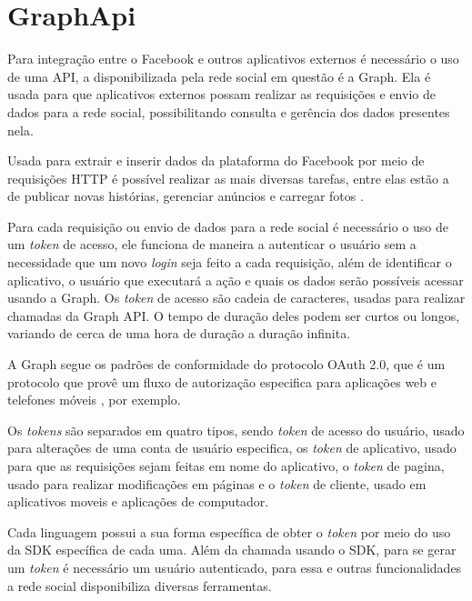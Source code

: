 \chapter[GraphApi]{GraphApi}

Para integração entre o Facebook e outros aplicativos externos é necessário o uso de uma API, a disponibilizada pela rede social em questão é a Graph. Ela é usada para que aplicativos externos possam realizar as requisições e envio de dados para a rede social, possibilitando consulta e gerência dos dados presentes nela. 


Usada para extrair e inserir dados da plataforma do Facebook por meio de requisições HTTP é possível realizar as mais diversas tarefas, entre elas estão a de publicar novas histórias, gerenciar anúncios e carregar fotos \cite{facebook2018b}.


Para cada requisição ou envio de dados para a rede social é necessário o uso de um \textit{token} de acesso, ele funciona de maneira a autenticar o usuário sem a necessidade que um novo \textit{login} seja feito a cada requisição, além de identificar o aplicativo, o usuário que executará a ação e quais os dados serão possíveis acessar usando a Graph. Os \textit{token} de acesso são cadeia de caracteres, usadas para realizar chamadas da Graph API. O tempo de duração deles podem ser curtos ou longos, variando de cerca de uma hora de duração a duração infinita.

A Graph segue os padrões de conformidade do protocolo OAuth 2.0, que é um protocolo que provê um fluxo de autorização especifica para aplicações web e telefones móveis \cite{oauth2018}, por exemplo. 

Os \textit{tokens} são separados em quatro tipos, sendo \textit{token} de acesso do usuário, usado para alterações de uma conta de usuário especifica, os  \textit{token} de aplicativo, usado para que as requisições sejam feitas em nome do aplicativo, o \textit{token} de pagina, usado para realizar modificações em páginas e o \textit{token} de cliente, usado em aplicativos moveis e aplicações de computador.


Cada linguagem possui a sua forma específica de obter o \textit{token} por meio do uso da SDK específica de cada uma. Além da chamada usando o SDK, para se gerar um \textit{token} é necessário um usuário autenticado, para essa e outras funcionalidades a rede social disponibiliza diversas ferramentas.

